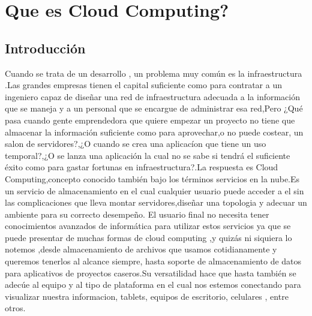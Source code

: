 \documentclass[12pt,a4paper]{article}
\author{Ignacio Perez Laborda}
\begin{document}


\tableofcontents

\listoffigures

\newpage

\section{Que es Cloud Computing?}

\subsection{Introducción}
Cuando se trata de un desarrollo , un problema muy común es la
infraestructura .Las grandes empresas tienen el capital
suficiente como para contratar a un ingeniero capaz de diseñar
una red de infraestructura adecuada a la información que se
maneja y a un personal que se encargue de administrar esa
red,Pero ¿Qué pasa cuando gente emprendedora que quiere empezar
un proyecto no tiene que almacenar la información suficiente
como para aprovechar,o no puede costear, un salon de
servidores?,¿O cuando se crea una aplicacíon que tiene un uso
temporal?,¿O se lanza una aplicación la cual no se sabe si
tendrá el suficiente éxito como para gastar fortunas en
infraestructura?.La respuesta es Cloud Computing,concepto
conocido también bajo los términos servicios en la nube.Es un
servicio de almacenamiento en el cual cualquier usuario puede
acceder a el sin las complicaciones que lleva montar
servidores,diseñar una topologia y adecuar un ambiente para su
correcto desempeño. El usuario final no necesita tener
conocimientos avanzados de informática para utilizar estos
servicios ya que se puede presentar de muchas formas de cloud
computing ,y quizás ni siquiera lo notemos ,desde almacenamiento
de archivos que usamos cotidianamente y queremos tenerlos al
alcance siempre, hasta soporte de almacenamiento de datos para
aplicativos de proyectos caseros.Su versatilidad hace que hasta
también se adecúe al equipo y al tipo de plataforma en el cual
nos estemos conectando para visualizar nuestra informacion,
tablets, equipos de escritorio, celulares , entre otros.\par
\end{document}
